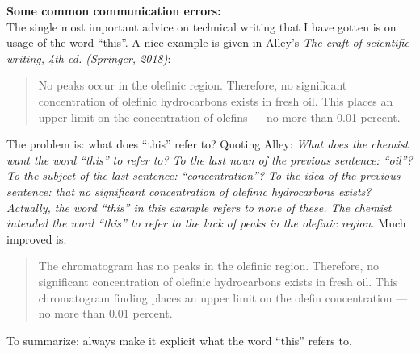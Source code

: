 \noindent
{\bf Some common communication errors:}\\

\noindent
The single most important advice on technical writing that I have gotten is on usage of the word ``this''.  A nice example is given in Alley's {\em The craft of scientific writing, 4th ed. (Springer, 2018)}:
\begin{quotation}\noindent
No peaks occur in the olefinic region. Therefore, no significant concentration of olefinic hydrocarbons exists in fresh oil. This places an upper limit on the concentration of olefins --- no more than 0.01 percent.
\end{quotation}
The problem is: what does ``this'' refer to?  Quoting Alley: \textit{What does the chemist want the word ``this'' to refer to? To the last noun of the previous sentence: ``oil''? To the subject of the last sentence: ``concentration''? To the idea of the previous sentence: that no significant concentration of olefinic hydrocarbons exists? Actually, the word ``this'' in this example refers to none of these. The chemist intended the word ``this'' to refer to the lack of peaks in the olefinic region.}
Much improved is:
\begin{quotation}\noindent
The chromatogram has no peaks in the olefinic region. Therefore, no significant concentration of olefinic hydrocarbons exists in fresh oil. This chromatogram finding places an upper limit on the olefin concentration --- no more than 0.01 percent.
\end{quotation}
To summarize: always make it explicit what the word ``this'' refers to.\\



